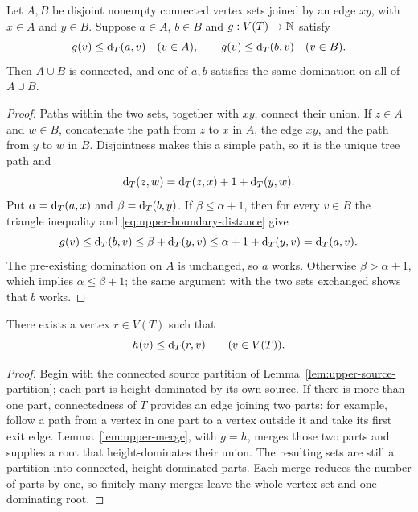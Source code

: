 \begin{lemma}\label{lem:upper-merge}
Let $A,B$ be disjoint nonempty connected vertex sets joined by an edge
$xy$, with $x\in A$ and $y\in B$.  Suppose $a\in A$, $b\in B$ and
$g:V(T)\to\mathbb N$ satisfy
\[
 g(v)\leq\operatorname{d}_T(a,v)\quad(v\in A),\qquad
 g(v)\leq\operatorname{d}_T(b,v)\quad(v\in B).
\]
Then $A\cup B$ is connected, and one of $a,b$ satisfies the same domination
on all of $A\cup B$.
\end{lemma}

\begin{proof}
Paths within the two sets, together with $xy$, connect their union.
If $z\in A$ and $w\in B$, concatenate the path from $z$ to $x$ in
$A$, the edge $xy$, and the path from $y$ to $w$ in $B$.  Disjointness
makes this a simple path, so it is the unique tree path and
\begin{equation}\label{eq:upper-boundary-distance}
 \operatorname{d}_T(z,w)=\operatorname{d}_T(z,x)+1+\operatorname{d}_T(y,w).
\end{equation}
Put $\alpha=\operatorname{d}_T(a,x)$ and $\beta=\operatorname{d}_T(b,y)$.
If $\beta\leq\alpha+1$, then for every $v\in B$ the triangle
inequality and \eqref{eq:upper-boundary-distance} give
\[
 g(v)\leq\operatorname{d}_T(b,v)
 \leq\beta+\operatorname{d}_T(y,v)
 \leq\alpha+1+\operatorname{d}_T(y,v)=\operatorname{d}_T(a,v).
\]
The pre-existing domination on $A$ is unchanged, so $a$ works.
Otherwise $\beta>\alpha+1$, which implies $\alpha\leq\beta+1$;
the same argument with the two sets exchanged shows that $b$ works.
\end{proof}

\begin{proposition}\label{prop:upper-consolidation}
There exists a vertex $r\in V(T)$ such that
\begin{equation}\label{eq:upper-height-domination}
 h(v)\leq\operatorname{d}_T(r,v)\qquad(v\in V(T)).
\end{equation}
\end{proposition}

\begin{proof}
Begin with the connected source partition of
Lemma~\ref{lem:upper-source-partition}; each part is height-dominated by
its own source.  If there is more than one part, connectedness of $T$
provides an edge joining two parts: for example, follow a path from a
vertex in one part to a vertex outside it and take its first exit edge.
Lemma~\ref{lem:upper-merge}, with $g=h$, merges those two parts and
supplies a root that height-dominates their union.  The resulting sets are
still a partition into connected, height-dominated parts.  Each merge
reduces the number of parts by one, so finitely many merges leave the
whole vertex set and one dominating root.
\end{proof}

